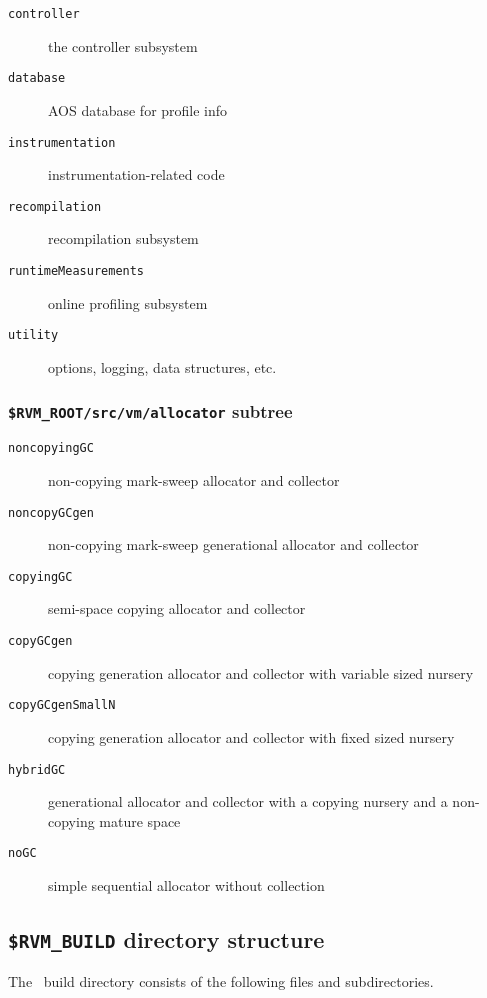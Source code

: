 \begin{description}
\item [{\tt controller}] the controller subsystem
\item [{\tt database}] AOS database for profile info
\item [{\tt instrumentation}] instrumentation-related code
\item [{\tt recompilation}] recompilation subsystem
\item [{\tt runtimeMeasurements}] online profiling subsystem
\item [{\tt utility}] options, logging, data structures, etc.
\end{description}

\subsubsection{{\tt \$RVM\_ROOT/src/vm/allocator} subtree}
\begin{description}
\item [{\tt noncopyingGC}] non-copying mark-sweep allocator and collector
\item [{\tt noncopyGCgen}] non-copying mark-sweep generational allocator and collector
\item [{\tt copyingGC}] semi-space copying allocator and collector
\item [{\tt copyGCgen}] copying generation allocator and collector with variable sized nursery
\item [{\tt copyGCgenSmallN}] copying generation allocator and collector with fixed sized nursery
\item [{\tt hybridGC}] generational allocator and collector with a copying nursery and a non-copying mature space
\item [{\tt noGC}] simple sequential allocator without collection
\end{description}

\subsection{{\tt \$RVM\_BUILD} directory structure}\label{rvmbuild}

The \jp\ build directory consists of the following files and subdirectories.

